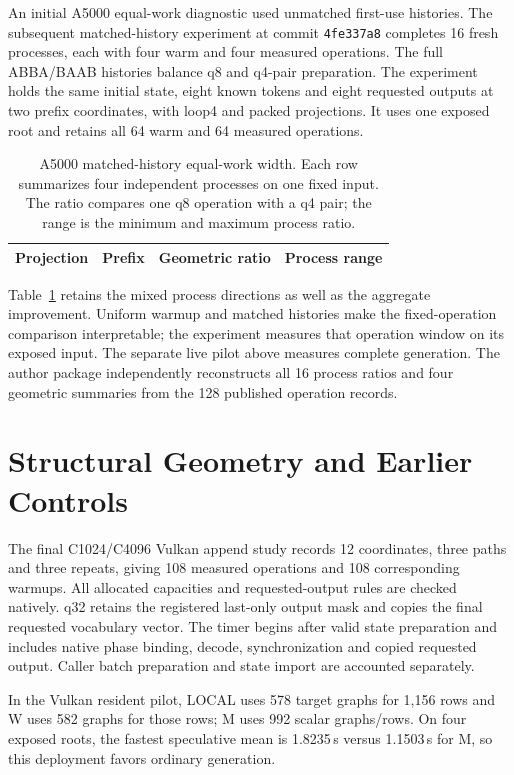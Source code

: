An initial A5000 equal-work diagnostic used unmatched first-use histories. The subsequent matched-history experiment at commit \texttt{4fe337a8} completes 16 fresh processes, each with four warm and four measured operations. The full ABBA/BAAB histories balance q8 and q4-pair preparation. The experiment holds the same initial state, eight known tokens and eight requested outputs at two prefix coordinates, with loop4 and packed projections. It uses one exposed root and retains all 64 warm and 64 measured operations.

\begin{table}[t]
\centering\footnotesize\tighttable
\caption{A5000 matched-history equal-work width. Each row summarizes four independent processes on one fixed input. The ratio compares one q8 operation with a q4 pair; the range is the minimum and maximum process ratio.}
\label{tab:b2}
\begin{tabular}{@{}lrrl@{}}\toprule
Projection & Prefix & Geometric ratio & Process range\\\midrule

\bottomrule\end{tabular}
\end{table}

Table~\ref{tab:b2} retains the mixed process directions as well as the aggregate improvement. Uniform warmup and matched histories make the fixed-operation comparison interpretable; the experiment measures that operation window on its exposed input. The separate live pilot above measures complete generation. The author package independently reconstructs all 16 process ratios and four geometric summaries from the 128 published operation records.

\section{Structural Geometry and Earlier Controls}


The final C1024/C4096 Vulkan append study records 12 coordinates, three paths and three repeats, giving 108 measured operations and 108 corresponding warmups. All allocated capacities and requested-output rules are checked natively. q32 retains the registered last-only output mask and copies the final requested vocabulary vector. The timer begins after valid state preparation and includes native phase binding, decode, synchronization and copied requested output. Caller batch preparation and state import are accounted separately.

In the Vulkan resident pilot, LOCAL uses 578 target graphs for 1,156 rows and W uses 582 graphs for those rows; M uses 992 scalar graphs/rows. On four exposed roots, the fastest speculative mean is 1.8235\,s versus 1.1503\,s for M, so this deployment favors ordinary generation.


